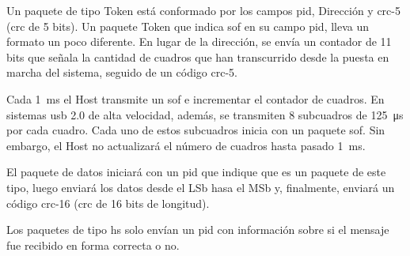 	Un paquete de tipo Token está conformado por los campos \acrshort{pid}, Dirección y \acrshort{crc}-5 (\acrshort{crc} de 5 bits). Un paquete Token que indica \acrshort{sof} en su campo \acrshort{pid}, lleva un formato un poco diferente. En lugar de la dirección, se envía un contador de 11 bits que señala la cantidad de cuadros que han transcurrido desde la puesta en marcha del sistema, seguido de un código \acrshort{crc}-5.%
		
	Cada \SI{1}{\milli\second} el Host transmite un \acrshort{sof} e incrementar el contador de cuadros. En sistemas \acrshort{usb} 2.0 de alta velocidad, además, se transmiten 8 subcuadros de \SI{125}{\micro\second} por cada cuadro. Cada uno de estos subcuadros inicia con un paquete \acrshort{sof}. Sin embargo, el Host no actualizará el número de cuadros hasta pasado \SI{1}{\milli\second}.%
		
	El paquete de datos iniciará con un \acrshort{pid} que indique que es un paquete de este tipo, luego enviará los datos desde el LSb hasa el MSb y, finalmente, enviará un código \acrshort{crc}-16 (\acrshort{crc} de 16 bits de longitud).%
		
	Los paquetes de tipo \acrshort{hs} solo envían un \acrshort{pid} con información sobre si el mensaje fue recibido en forma correcta o no.